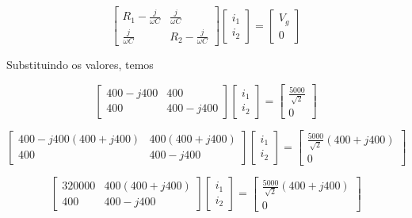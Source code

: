 \begin{equation}\label{eq:9.69.3}
    \begin{bmatrix}
        R_1 - \frac{j}{\omega C} & \frac{j}{\omega C}     \\
        \frac{j}{\omega C}     & R_2 - \frac{j}{\omega C}
    \end{bmatrix}
    \begin{bmatrix}
        i_1 \\
        i_2
    \end{bmatrix}
    =
    \begin{bmatrix}
        V_g \\
        0
    \end{bmatrix}
\end{equation}
\endgroup


Substituindo os valores, temos

\begingroup
\renewcommand*{\arraystretch}{3}

\[
    \begin{bmatrix}
        400 - j400 & 400       \\
        400      & 400 - j400
    \end{bmatrix}
    \begin{bmatrix}
        i_1 \\
        i_2
    \end{bmatrix}
    =
    \begin{bmatrix}
        \frac{5000}{\sqrt{2}} \\
        0
    \end{bmatrix}
\]

\[
    \begin{bmatrix}
        400 - j400 (400 + j400) & 400    (400 + j400)    \\
        400      & 400 - j400
    \end{bmatrix}
    \begin{bmatrix}
        i_1 \\
        i_2
    \end{bmatrix}
    =
    \begin{bmatrix}
        \frac{5000}{\sqrt{2}} (400 + j400) \\
        0
    \end{bmatrix}
\]

\[
    \begin{bmatrix}
        320000 & 400    (400 + j400)    \\
        400      & 400 - j400
    \end{bmatrix}
    \begin{bmatrix}
        i_1 \\
        i_2
    \end{bmatrix}
    =
    \begin{bmatrix}
        \frac{5000}{\sqrt{2}} (400 + j400) \\
        0
    \end{bmatrix}
\]

